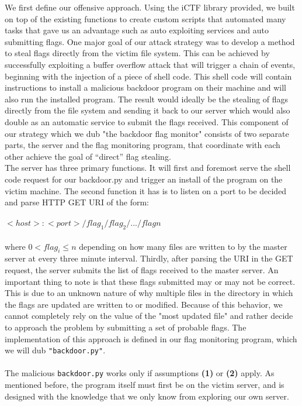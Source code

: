 \documentclass[12pt]{report}
\begin{document}
We first define our offensive approach. Using the iCTF library provided, we built on top of the existing functions to create custom scripts that automated many tasks that gave us an advantage such as auto exploiting services and auto submitting flags. One major goal of our attack strategy was to develop a method to steal flags directly from the victim file system. This can be achieved by successfully exploiting a buffer overflow attack that will trigger a chain of events, beginning with the injection of a piece of shell code. This shell code will contain instructions to install a malicious backdoor program on their machine and will also run the installed program. The result would ideally be the stealing of flags directly from the file system and sending it back to our server which would also double as an automatic service to submit the flags received. This component of our strategy which we dub "the backdoor flag monitor" consists of two separate parts, the server and the flag monitoring program, that coordinate with each other achieve the goal of “direct” flag stealing. \\

The server has three primary functions. It will first and foremost serve the shell code request for our backdoor.py and trigger an install of the program on the victim machine. The second function it has is to listen on a port to be decided and parse HTTP GET URI of the form:\\\\
$<host>:<port>/flag_{1}/flag_{2}/.../flag{n}$\\\\ where $0 < flag_i \leq n$ depending on how many files are written to by the master server at every three minute interval. Thirdly, after parsing the URI in the GET request, the server submits the list of flags received to the master server. An important thing to note is that these flags submitted may or may not be correct. This is due to an unknown nature of why multiple files in the directory in which the flags are updated are written to or modified. Because of this behavior, we cannot completely rely on the value of the "most updated file" and rather decide to approach the problem by submitting a set of probable flags. The implementation of this approach is defined in our flag monitoring program, which we will dub \texttt{"backdoor.py"}.\\\\

The malicious \texttt{backdoor.py} works only if assumptions \textbf{(1)} or \textbf{(2)} apply. As mentioned before, the program itself must first be on the victim server, and is designed with the knowledge that we only know from exploring our own server. 
\end{document}
